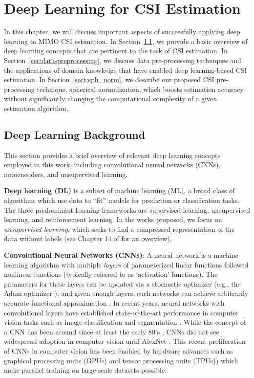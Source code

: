 \chapter{Deep Learning for CSI Estimation}
\label{chap:sph_norm}

In this chapter, we will discuss important aspects of successfully applying deep learning to MIMO CSI estimation. In Section~\ref{sect:dl_overview}, we provide a basic overview of deep learning concepts that are pertinent to the task of CSI estimation. In Section~\ref{sec:data-preprocessing}, we discuss data pre-processing techniques and the applications of domain knowledge that have enabled deep learning-based CSI estimation. In Section~\ref{sect:sph_norm}, we describe our proposed CSI pre-processing technique, spherical normalization, which boosts estimation accuracy without significantly changing the computational complexity of a given estimation algorithm. 

\section{Deep Learning Background}
\label{sect:dl_overview}

This section provides a brief overview of relevant deep learning concepts employed in this work, including convolutional neural networks (CNNs), autoencoders, and unsupervised learning.

\textbf{Deep learning (DL)} is a subset of machine learning (ML), a broad class of algorithms which use data to ``fit'' models for prediction or classification tasks. The three predominant learning frameworks are supervised learning, unsupervised learning, and reinforcement learning. In the works proposed, we focus on \emph{unsupervised learning}, which seeks to find a compressed representation of the data without labels (see Chapter 14 of \cite{ref:Hastie2016Elements} for an overview).

\textbf{Convolutional Neural Networks (CNNs)}: A neural network is a machine learning algorithm with multiple \emph{layers} of parameterized linear functions followed nonlinear functions (typically referred to as `activation' functions). The parameters for these layers can be updated via a stochastic optimizer (e.g., the Adam optimizer \cite{ref:Kingma2014ADAM}), and given enough layers, such networks can achieve arbitrarily accurate functional approximation \cite{ref:Hecht1992TheoryBackprop}. In recent years, neural networks with convolutional layers have established state-of-the-art performance in computer vision tasks such as image classification \cite{ref:Sabour2017Dynamic} and segmentation \cite{ref:He2017Mask}. While the concept of a CNN has been around since at least the early 80's \cite{ref:fukushima1980neocognitron}, CNNs did not see widespread adoption in computer vision until AlexNet \cite{ref:krizhevsky2012imagenet}. This recent proliferation of CNNs in computer vision has been enabled by hardware advances  such as graphical processing units (GPUs) and tensor processing units (TPUs)) which make parallel training on large-scale datasets possible.

